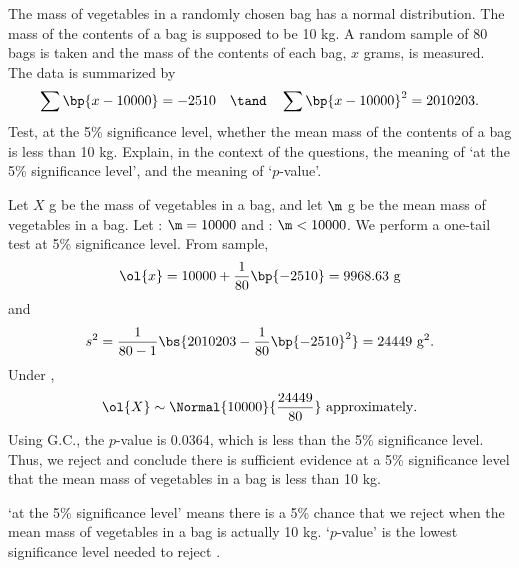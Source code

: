\begin{problem}
    The mass of vegetables in a randomly chosen bag has a normal distribution. The mass of the contents of a bag is supposed to be 10 kg. A random sample of 80 bags is taken and the mass of the contents of each bag, $x$ grams, is measured. The data is summarized by \[\sum \bp{x - 10000} = -2510 \quad \tand \quad \sum\bp{x - 10000}^2 = 2010203.\] Test, at the 5\% significance level, whether the mean mass of the contents of a bag is less than 10 kg. Explain, in the context of the questions, the meaning of `at the 5\% significance level', and the meaning of `$p$-value'.
\end{problem}
\begin{solution}
    Let $X$ g be the mass of vegetables in a bag, and let $\m$ g be the mean mass of vegetables in a bag. Let \nullhyp: $\m = 10000$ and \althyp: $\m < 10000$. We perform a one-tail test at 5\% significance level. From sample, \[\ol{x} = 10000 + \frac1{80} \bp{-2510} = 9968.63 \text{ g}\] and \[s^2 = \frac1{80-1} \bs{2010203 - \frac1{80} \bp{-2510}^2} = 24449 \text{ g}^2.\] Under \nullhyp, \[\ol{X} \sim \Normal{10000}{\frac{24449}{80}} \text{ approximately}.\] Using G.C., the $p$-value is 0.0364, which is less than the 5\% significance level. Thus, we reject \nullhyp{} and conclude there is sufficient evidence at a 5\% significance level that the mean mass of vegetables in a bag is less than 10 kg.

    `at the 5\% significance level' means there is a 5\% chance that we reject \nullhyp{} when the mean mass of vegetables in a bag is actually 10 kg. `$p$-value' is the lowest significance level needed to reject \nullhyp.
\end{solution}
